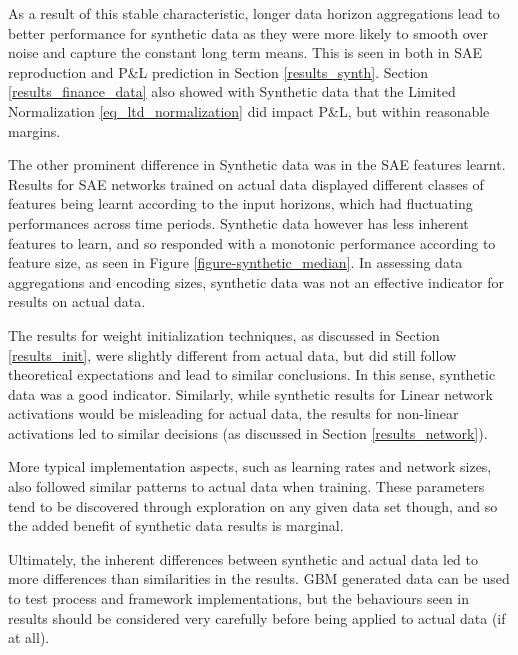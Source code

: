 \documentclass[a4paper,11pt,oneside]{article}
\theoremstyle{plain}
\theoremstyle{definition}
\begin{document}
		As a result of this stable characteristic, longer data horizon aggregations lead to better performance for synthetic data as they were more likely to smooth over noise and capture the constant long term means. This is seen in both in SAE reproduction and P\&L prediction in Section \ref{results_synth}. Section \ref{results_finance_data} also showed with Synthetic data that the Limited Normalization \eqref{eq_ltd_normalization} did impact P\&L, but within reasonable margins.\newline
	
		The other prominent difference in Synthetic data was in the SAE features learnt. Results for SAE networks trained on actual data displayed different classes of features being learnt according to the input horizons, which had fluctuating performances across time periods. Synthetic data however has less inherent features to learn, and so responded with a monotonic performance according to feature size, as seen in Figure \ref{figure-synthetic_median}. In assessing data aggregations and encoding sizes, synthetic data was not an effective indicator for results on actual data. \newline
	
		The results for weight initialization techniques, as discussed in Section \ref{results_init}, were slightly different from actual data, but did still follow theoretical expectations and lead to similar conclusions. In this sense, synthetic data was a good indicator. Similarly, while synthetic results for Linear network activations would be misleading for actual data, the results for non-linear activations led to similar decisions (as discussed in Section \ref{results_network}).\newline
		
		More typical implementation aspects, such as learning rates and network sizes, also followed similar patterns to actual data when training. These parameters tend to be discovered through exploration on any given data set though, and so the added benefit of synthetic data results is marginal.\newline
		
		Ultimately, the inherent differences between synthetic and actual data led to more differences than similarities in the results. GBM generated data can be used to test process and framework implementations, but the behaviours seen in results should be considered very carefully before being applied to actual data (if at all).
	
	
	
\end{document}
